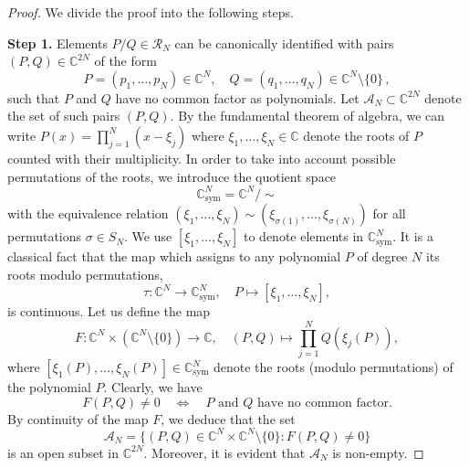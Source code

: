 \documentclass[11pt,reqno]{amsart}
\theoremstyle{definition}
\theoremstyle{remark}
\theoremstyle{remark}
\numberwithin{equation}{section}
\newcommand{\C}{\mathbb{C}}
\begin{document}
\begin{proof}
We divide the proof into the following steps.

\medskip
\textbf{Step 1.}  Elements $P/Q \in \mathcal{R}_N$ can be canonically identified with pairs $(P,Q) \in \C^{2N}$ of the form
$$
P = (p_1, \ldots, p_N) \in \C^N, \quad Q = (q_1, \ldots, q_N) \in \C^N \setminus \{ 0 \} \, ,
$$
such that $P$ and $Q$ have no common factor as polynomials. Let $\mathcal{A}_N \subset \C^{2N}$ denote the set of such pairs $(P,Q)$. By the fundamental theorem of algebra, we can write $P(x) = \prod_{j=1}^N (x-\xi_j)$ where $\xi_1, \ldots, \xi_N \in \C$ denote the roots of $P$ counted with their multiplicity. In order to take into account possible permutations of the roots, we introduce the quotient space 
$$\C^N_{\mathrm{sym}} = \C^N / \sim$$ 
with the equivalence relation $(\xi_1, \ldots, \xi_N) \sim (\xi_{\sigma(1)}, \ldots, \xi_{\sigma(N)})$ for all permutations $\sigma \in S_N$. We use $[\xi_1, \ldots, \xi_N]$ to denote elements in $\C^N_{\mathrm{sym}}$. It is a classical fact that the map which assigns to any polynomial $P$ of degree $N$ its roots modulo permutations,
$$
\tau : \C^N \to \C^N_{\mathrm{sym}}, \quad P \mapsto [\xi_1, \ldots, \xi_N],
$$
is continuous. Let us define the map
$$
F : \C^N \times (\C^{N} \setminus \{ 0 \} ) \to \C, \quad (P,Q) \mapsto \prod_{j=1}^N Q(\xi_j(P)), 
$$
where $[\xi_1(P), \ldots, \xi_N(P)] \in \C^N_{\mathrm{sym}}$ denote the roots (modulo permutations) of the polynomial $P$. Clearly, we have
$$
F(P,Q) \neq 0 \quad \Leftrightarrow \quad \mbox{$P$ and $Q$ have no common factor}.
$$
By continuity of the map $F$, we deduce that the set
$$
\mathcal{A}_N = \{ (P,Q) \in \C^N \times \C^N \setminus \{ 0 \} : F(P,Q) \neq 0 \}
$$
is an open subset in $\C^{2N}$. Moreover, it is evident that $\mathcal{A}_N$ is non-empty.


\end{proof}
\end{document}
